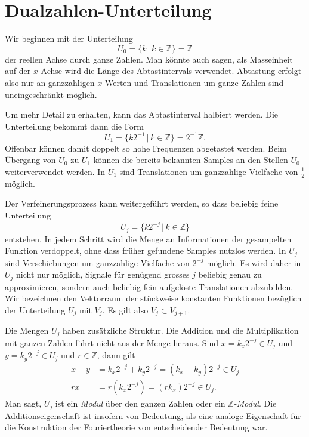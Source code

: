 %
%
%
\section{Dualzahlen-Unterteilung%
\label{section:dualzahlen}}
Wir beginnen mit der Unterteilung
\[
U_0
=
\{ k\,|\, k\in\mathbb Z\}
=
\mathbb Z
\]
der reellen Achse durch ganze Zahlen.
Man könnte auch sagen, als Masseinheit auf der $x$-Achse wird die
Länge des Abtastintervals verwendet.
Abtastung erfolgt also nur an ganzzahligen $x$-Werten und
Translationen um ganze Zahlen sind uneingeschränkt möglich.

Um mehr Detail zu erhalten, kann das Abtastinterval halbiert werden.
Die Unterteilung bekommt dann die Form
\[
U_1
=
\{ k2^{-1}\,|\, k\in\mathbb Z\}
=
2^{-1}\mathbb Z.
\]
Offenbar können damit doppelt so hohe Frequenzen abgetastet werden.
Beim Übergang von $U_0$ zu $U_1$ können die bereits bekannten Samples
an den Stellen $U_0$ weiterverwendet werden.
In $U_1$ sind Translationen um ganzzahlige Vielfache von $\frac12$ 
möglich.

Der Verfeinerungsprozess kann weitergeführt werden, so dass beliebig
feine Unterteilung
\[
U_j = \{ k2^{-j}\,|\,k\in\mathbb Z\}
\]
entstehen.
In jedem Schritt wird die Menge an Informationen der gesampelten Funktion
verdoppelt, ohne dass früher gefundene Samples nutzlos werden.
In $U_j$ sind Verschiebungen um ganzzahlige Vielfache von $2^{-j}$ 
möglich.
Es wird daher in $U_j$ nicht nur möglich, Signale für genügend grosses $j$
beliebig genau zu approximieren, sondern auch beliebig fein aufgelöste
Translationen abzubilden.
Wir bezeichnen den Vektorraum der stückweise konstanten Funktionen
bezüglich der Unterteilung $U_j$ mit $V_j$.
Es gilt also $V_j \subset V_{j+1}$.

Die Mengen $U_j$ haben zusätzliche Struktur.
Die Addition und die Multiplikation mit ganzen Zahlen führt nicht aus
der Menge heraus.
Sind $x=k_x2^{-j}\in U_j$ und $y=k_y2^{-j}\in U_j$ und $r\in\mathbb Z$,
dann gilt
\begin{align*}
x+y &= k_x 2^{-j}+k_y2^{-j}=(k_x+k_y)2^{-j}\in U_j
\\
rx&=r(k_x2^{-j}) = (rk_x)2^{-j}\in U_j.
\end{align*}
Man sagt, $U_j$ ist ein {\em Modul} über den ganzen Zahlen oder ein
{\em $\mathbb Z$-Modul}.
Die Additionseigenschaft ist insofern von Bedeutung, als eine analoge
Eigenschaft für die Konstruktion der Fouriertheorie von entscheidender
Bedeutung war.

